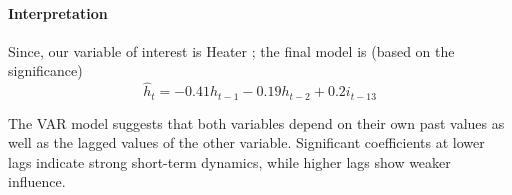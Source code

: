\documentclass[10pt,a4paper]{article}
\begin{document}
	\paragraph{Interpretation}
	Since, our variable of interest is Heater ; the final model is (based on the significance)
	$$
	\hat{h}_t = - 0.41h_{t-1} - 0.19h_{t-2} + 0.2i_{t-13}
	$$
	
	The VAR model suggests that both variables depend on their own past values as well as the lagged values of the other variable. Significant coefficients at lower lags indicate strong short-term dynamics, while higher lags show weaker influence.
	
\end{document}

